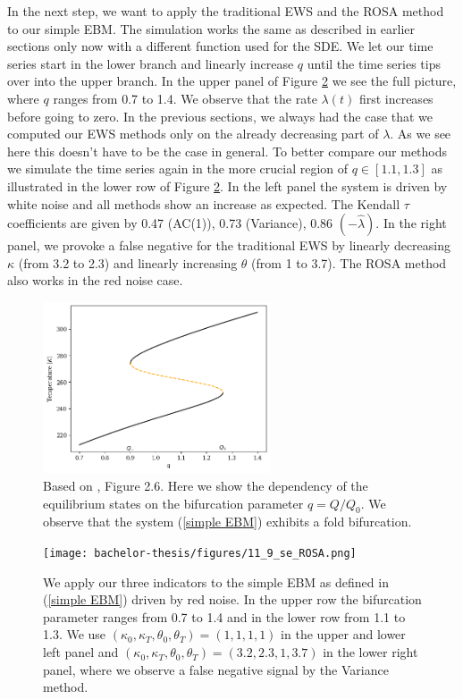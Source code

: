 \documentclass[%
thesis=student,%
coverpage=false,%
titlepage=false,%
headmarks=true, %
english,%
font=libertine, %
math=newpxtx, %
BCOR=5mm,%
coverBCOR=11mm%
]{tumbook}
\begin{document}
In the next step, we want to apply the traditional EWS and the ROSA method to our simple EBM.
The simulation works the same as described in earlier sections only now with a different function used for the SDE. We let our time series start in the lower branch and linearly increase $q$ until the time series tips over into the upper branch. In the upper panel of Figure \ref{fig:ROSA test} we see the full picture, where $q$ ranges from 0.7 to 1.4. We observe that the rate $\lambda(t)$ first increases before going to zero. In the previous sections, we always had the case that we computed our EWS methods only on the already decreasing part of $\lambda$. As we see here this doesn't have to be the case in general. To better compare our methods we simulate the time series again in the more crucial region of $q \in [1.1,1.3]$ as illustrated in the lower row of Figure \ref{fig:ROSA test}. In the left panel the system is driven by white noise and all methods show an increase as expected. The Kendall $\tau$ coefficients are given by 0.47 (AC(1)), 0.73 (Variance), 0.86 $(-\widehat{\lambda})$. In the right panel, we provoke a false negative for the traditional EWS by linearly decreasing $\kappa$ (from 3.2 to 2.3) and linearly increasing $\theta$ (from 1 to 3.7). The ROSA method also works in the red noise case.

\begin{figure}[t]
    \centering
    \includegraphics[width=0.6\textwidth]{bachelor-thesis/figures/se_bif_plot.png}
    \caption{Based on \cite{Kaper:2013}, Figure 2.6. Here we show the dependency of the equilibrium states on the bifurcation parameter $q = Q/Q_{0}$. We observe that the system (\ref{simple EBM}) exhibits a fold bifurcation.}
    \label{fig:se_bif}
\end{figure}



\begin{figure}[b]
    \centering
    \texttt{[image: bachelor-thesis/figures/11\_9\_se\_ROSA.png]}
    \caption{We apply our three indicators to the simple EBM as defined in (\ref{simple EBM}) driven by red noise. In the upper row the bifurcation parameter ranges from 0.7 to 1.4  and in the lower row from 1.1 to 1.3. We use $(\kappa_{0},\kappa_{T},\theta_{0},\theta_{T}) = (1,1,1,1)$ in the upper and lower left panel and $(\kappa_{0},\kappa_{T},\theta_{0},\theta_{T}) = (3.2,2.3,1,3.7)$ in the lower right panel, where we observe a false negative signal by the Variance method.}
    \label{fig:ROSA test}
\end{figure}
\end{document}
